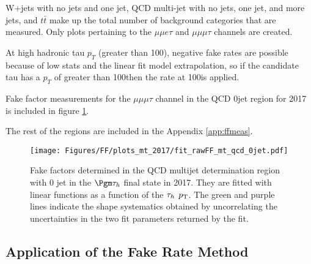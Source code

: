 W+jets with no jets and one jet, QCD multi-jet with no jets, one jet, and more jets, and $t\bar{t}$ make up the total number of background categories that are measured. Only plots pertaining to the $\mu\mu e \tau$ and $\mu\mu \mu \tau$ channels are created. 

At high hadronic tau $p_T$ (greater than 100\GeV), negative fake rates are possible because of low stats and the linear fit model extrapolation, so if the candidate tau has a $p_T$ of greater than 100\GeV then the rate at 100\GeV is applied. 

Fake factor measurements for the $\mu\mu\mu\tau$ channel in the QCD 0jet region for 2017 is included in figure \ref{fig:fit_raw_mt_0jet_qcd}. 

The rest of the regions are included in the Appendix \ref{app:ffmeas}.




\begin{figure}[ht!b]
\centering
\texttt{[image: Figures/FF/plots\_mt\_2017/fit\_rawFF\_mt\_qcd\_0jet.pdf]}\\
\caption{\label{fig:fit_raw_mt_0jet_qcd} Fake factors determined in the QCD multijet determination region with 0 jet in the $\Pgm\tauh$ final state in 2017. They are fitted with linear functions as a function of the $\tau_h$ $p_{\mathrm{T}}$. The green and purple lines indicate the shape systematics obtained by uncorrelating the uncertainties in the two fit parameters returned by the fit.  }
\end{figure}





\clearpage

\subsection{Application of the Fake Rate Method}

